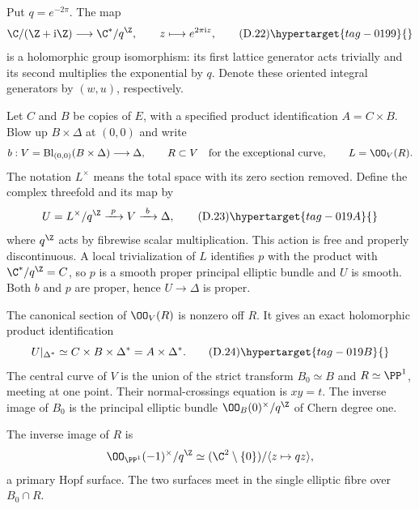 
Put $q=e^{-2\pi}$. The map
\[
 \C/(\Z+\mathrm i\Z)\longrightarrow\C^*/q^{\Z},
 \qquad z\longmapsto e^{2\pi\mathrm i z},
\tag{D.22}\hypertarget{tag-0199}{}\label{cdp:eq:D.22}
\]
is a holomorphic group isomorphism: its first lattice generator
acts trivially and its second multiplies the exponential by
$q$. Denote these oriented integral generators by $(w,u)$,
respectively.



\item Let $C$ and $B$ be copies of $E$, with a specified product
identification $A=C\times B$. Blow up $B\times\Delta$ at
$(0,0)$ and write
\[
 b:V=\operatorname{Bl}_{(0,0)}(B\times\Delta)\longrightarrow\Delta,
 \qquad R\subset V\quad\hbox{for the exceptional curve},
 \qquad L=\OO_V(R).
\]
The notation $L^\times$ means the total space with its zero
section removed. Define the complex threefold and its map by
\[
 U=L^\times/q^{\Z}\xrightarrow{\ p\ }V\xrightarrow{\ b\ }\Delta,
\tag{D.23}\hypertarget{tag-019A}{}\label{cdp:eq:D.23}
\]
where $q^{\Z}$ acts by fibrewise scalar multiplication. This
action is free and properly discontinuous. A local
trivialization of $L$ identifies $p$ with the product with
$\C^*/q^{\Z}=C$, so $p$ is a smooth proper principal elliptic
bundle and $U$ is smooth. Both $b$ and $p$ are proper, hence
$U\to\Delta$ is proper.



\item The canonical section of $\OO_V(R)$ is nonzero off $R$.
It gives an exact holomorphic product identification
\[
 U|_{\Delta^*}\simeq C\times B\times\Delta^*
                         =A\times\Delta^*.
\tag{D.24}\hypertarget{tag-019B}{}\label{cdp:eq:D.24}
\]
The central curve of $V$ is the union of the strict transform
$B_0\simeq B$ and $R\simeq\PP^1$, meeting at one point.
Their normal-crossings equation is $xy=t$. The inverse image
of $B_0$ is the principal elliptic bundle
$\OO_B(0)^\times/q^{\Z}$ of Chern degree one. 

The inverse image of $R$ is
\[
 \OO_{\PP^1}(-1)^\times/q^{\Z}
       \simeq(\C^2\setminus\{0\})/\langle z\mapsto qz\rangle,
\]
a primary Hopf surface. The two surfaces meet in the single
elliptic fibre over $B_0\cap R$. 

